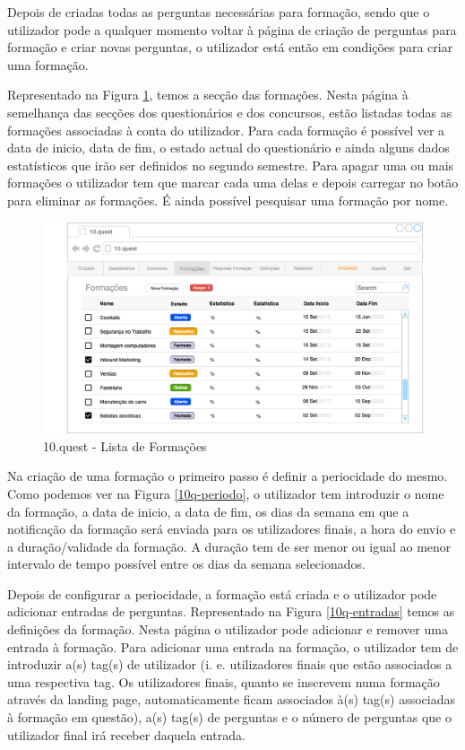 Depois de criadas todas as perguntas necessárias para formação, sendo que o utilizador pode a qualquer momento voltar à página de criação de perguntas para formação e criar novas perguntas, o utilizador está então em condições para criar uma formação.

Representado na Figura \ref{10q-Lformacoes}, temos a secção das formações. Nesta página à semelhança das secções dos questionários e dos concursos, estão listadas todas as formações associadas à conta do utilizador. Para cada formação é possível ver a data de inicio, data de fim, o estado actual do questionário e ainda alguns dados estatísticos que irão ser definidos no segundo semestre.
Para  apagar uma ou mais formações o utilizador tem que marcar cada uma delas e depois carregar no botão para eliminar as formações. É ainda possível pesquisar uma formação por nome.
\newpage

\begin{figure}[ht!]
	\begin{center}
		\includegraphics[width=1\textwidth]{img/prototipos/8.png}
		\caption{10.quest - Lista de Formações}
		\label{10q-Lformacoes}
	\end{center}
\end{figure}


Na criação de uma formação o primeiro passo é definir a periocidade do mesmo. Como podemos ver na Figura \ref{10q-periodo}, o utilizador tem introduzir o nome da formação, a data de inicio, a data de fim, os dias da semana em que a notificação da formação será enviada para os utilizadores finais, a hora do envio e a duração/validade da formação. A duração tem de ser menor ou igual ao menor intervalo de tempo possível entre os dias da semana selecionados.

Depois de configurar a periocidade, a formação está criada e o utilizador pode adicionar entradas de perguntas. Representado na Figura \ref{10q-entradas} temos as definições da formação. Nesta página o utilizador pode adicionar e remover uma entrada à formação. Para adicionar uma entrada na formação, o utilizador tem de introduzir a(s) tag(s) de utilizador (i. e. utilizadores finais que estão associados a uma respectiva tag. Os utilizadores finais, quanto se inscrevem numa formação através da landing page, automaticamente ficam associados à(s) tag(s) associadas à formação em questão), a(s) tag(s) de perguntas e o número de perguntas que o utilizador final irá receber daquela entrada.

